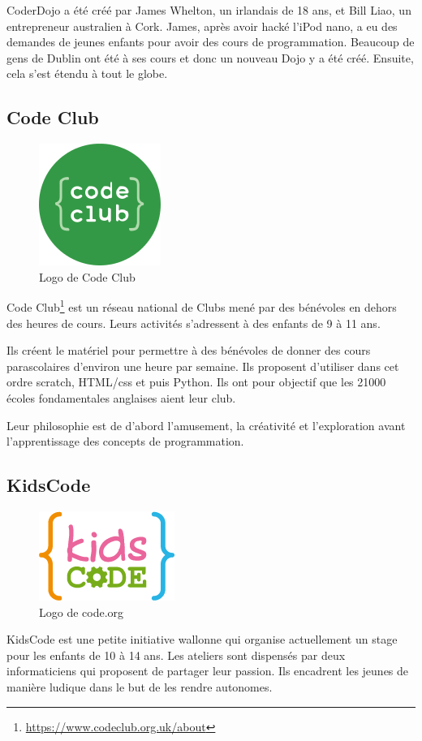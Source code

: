 CoderDojo a été créé par James Whelton, un irlandais de 18 ans, et Bill Liao, un entrepreneur australien à Cork. James, après avoir hacké l'iPod nano, a eu des demandes de jeunes enfants pour avoir des cours de programmation. Beaucoup de gens de Dublin ont été à ses cours et donc un nouveau Dojo y a été créé. Ensuite, cela s'est étendu à tout le globe.

\subsection{Code Club}
\begin{figure}[!h]
  \begin{center}
    \includegraphics[scale=0.3]{content/5-related_work/images/club}
    \caption{Logo de Code Club}
    \label{fig:code club}
  \end{center}
\end{figure}
Code Club\footnote{\url{https://www.codeclub.org.uk/about}} est un réseau national de Clubs mené par des bénévoles en dehors des heures de cours. Leurs activités s'adressent à des enfants de 9 à 11 ans.

Ils créent le matériel pour permettre à des bénévoles de donner des cours parascolaires d'environ une heure par semaine. Ils proposent d'utiliser dans cet ordre scratch, HTML/css et puis Python. Ils ont pour objectif que les 21000 écoles fondamentales anglaises aient leur club.

Leur philosophie est de d'abord l'amusement, la créativité et l'exploration avant l'apprentissage des concepts de programmation.
\subsection{KidsCode}
\label{init-kidscode}
\begin{figure}[!h]
  \begin{center}
    \includegraphics[scale=0.5]{content/5-related_work/images/kidscode}
    \caption{Logo de code.org}
    \label{fig:code.org}
  \end{center}
\end{figure}
KidsCode est une petite initiative wallonne qui organise actuellement un stage pour les enfants de 10 à 14 ans. Les ateliers sont dispensés par deux informaticiens qui proposent de partager leur passion. Ils encadrent les jeunes de manière ludique dans le but de les rendre autonomes.

